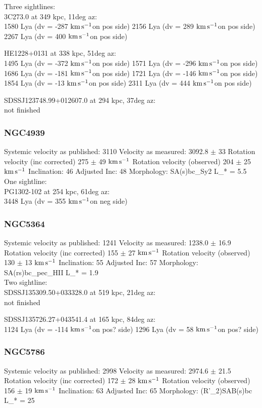 \documentclass[iop]{emulateapj-rtx4}
\newcommand{\kms}{$\rm km\, s^{-1}$}
\begin{document}
Three sightlines: \\
3C273.0 at 349 kpc, 11deg az: \\
1580 Lya (dv = -287 \kms on pos side)
2156 Lya (dv = 289 \kms on pos side)
2267 Lya (dv = 400 \kms on pos side)


HE1228+0131 at 338 kpc, 51deg az: \\
1495 Lya (dv = -372 \kms on pos side)
1571 Lya (dv = -296 \kms on pos side)
1686 Lya (dv = -181 \kms on pos side)
1721 Lya (dv = -146 \kms on pos side)
1854 Lya (dv = -13 \kms on pos side)
2311 Lya (dv = 444 \kms on pos side)

SDSSJ123748.99+012607.0 at  294 kpc, 37deg az: \\
not finished


\subsubsection{NGC4939}
Systemic velocity as published: 3110
Velocity as measured: 3092.8 $\pm$ 33
Rotation velocity (inc corrected) 275 $\pm$ 49 \kms
Rotation velocity (observed) 204 $\pm$ 25 \kms
Inclination: 46
Adjusted Inc: 48
Morphology: SA(s)bc_Sy2
L_{\**} = 5.5 \\

One sightline: \\
PG1302-102 at 254 kpc, 61deg az: \\
3448 Lya (dv = 355 \kms on neg side)



\subsubsection{NGC5364}
Systemic velocity as published: 1241
Velocity as measured: 1238.0 $\pm$ 16.9
Rotation velocity (inc corrected) 155 $\pm$ 27 \kms
Rotation velocity (observed) 130 $\pm$ 13 \kms
Inclination: 55
Adjusted Inc: 57
Morphology: SA(rs)bc_pec_HII
L_{\**} = 1.9 \\

Two sightline: \\
SDSSJ135309.50+033328.0 at 519 kpc, 21deg az: \\
not finished

SDSSJ135726.27+043541.4 at 165 kpc, 84deg az: \\
1124 Lya (dv = -114 \kms on pos? side)
1296 Lya (dv = 58 \kms on pos? side)



\subsubsection{NGC5786}
Systemic velocity as published: 2998
Velocity as measured: 2974.6 $\pm$ 21.5
Rotation velocity (inc corrected) 172 $\pm$ 28 \kms
Rotation velocity (observed) 156 $\pm$ 19 \kms
Inclination: 63
Adjusted Inc: 65
Morphology: (R'_2)SAB(s)bc
L_{\**} = 25 \\
\end{document}
